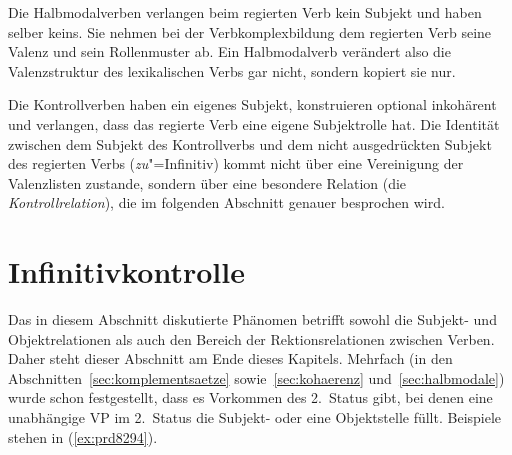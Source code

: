 
Die Halbmodalverben verlangen beim regierten Verb kein Subjekt und haben selber keins.
Sie nehmen bei der Verbkomplexbildung dem regierten Verb seine Valenz und sein Rollenmuster ab.
Ein Halbmodalverb verändert also die Valenzstruktur des lexikalischen Verbs gar nicht, sondern kopiert sie nur.


Die Kontrollverben haben ein eigenes Subjekt, konstruieren optional inkohärent und verlangen, dass das regierte Verb eine eigene Subjektrolle hat.
Die Identität zwischen dem Subjekt des Kontrollverbs und dem nicht ausgedrückten Subjekt des regierten Verbs (\textit{zu}"=Infinitiv) kommt nicht über eine Vereinigung der Valenzlisten zustande, sondern über eine besondere Relation (die \textit{Kontrollrelation}), die im folgenden Abschnitt genauer besprochen wird.




\section{Infinitivkontrolle}

\label{sec:infkonstr}
\label{sec:kontrollinfinitive}


Das in diesem Abschnitt diskutierte Phänomen betrifft sowohl die Subjekt- und Objektrelationen als auch den Bereich der Rektionsrelationen zwischen Verben.
Daher steht dieser Abschnitt am Ende dieses Kapitels.
Mehrfach (\zB in den Abschnitten~\ref{sec:komplementsaetze} sowie~\ref{sec:kohaerenz} und~\ref{sec:halbmodale}) wurde schon festgestellt, dass es Vorkommen des 2.~Status gibt, bei denen eine unabhängige VP im 2.~Status \zB die Subjekt- oder eine Objektstelle füllt.
Beispiele stehen in (\ref{ex:prd8294}).

\begin{exe}
  \ex\label{ex:prd8294} 
  \begin{xlist}
  \end{xlist}
\end{exe}

